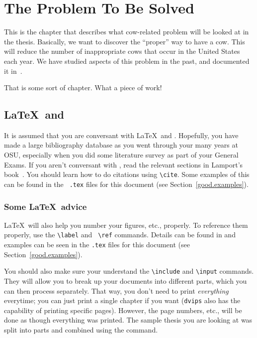 \chapter{The Problem To Be Solved}
\label{prob.ch}

This is the chapter that describes what cow-related problem will
be looked at in the thesis.  Basically, we want to discover the
``proper'' way to have a cow.  This will reduce the number of
inappropriate cows that occur in the United States each year.
We have studied aspects of this problem in the past, and documented it
in~\cite{bsimp00}.


That is some sort of chapter.  What a piece of work!

\section{\LaTeX\ and \BibTeX}

It is assumed that you are conversant with \LaTeX\ and \BibTeX.
Hopefully, you have made a large bibliography database as you went
through your many years at OSU, especially when you did some literature
survey as part of your General Exams. If you aren't conversant with
\BibTeX, read the relevant sections in Lamport's
book~\cite{lamport:latex}. You should learn how to do citations using
{\tt \verb+\+cite}.  Some examples of this can be found in the {\tt
.tex} files for this document (see Section~\ref{good.examples}).

\subsection{Some \LaTeX\ advice}

\LaTeX\ will also help you number your figures, etc., properly. To
reference them properly, use the {\tt \verb+\+label} and {\tt
\verb+\+ref} commands. Details can be found in \cite{lamport:latex}
and examples can be seen in the {\tt .tex} files for this document 
(see Section~\ref{good.examples}).

You should also make sure your understand the {\tt \verb+\+include} and
{\tt \verb+\+input} commands. They will allow you to break up your
documents into different parts, which you can then process separately.
That way, you don't need to print {\em everything} everytime; you can
just print a single chapter if you want ({\tt dvips} also has the
capability of printing specific pages).  However, the page numbers,
etc., will be done as though everything was printed. The sample thesis
you are looking at was split into parts and combined using the
\verb## command.

